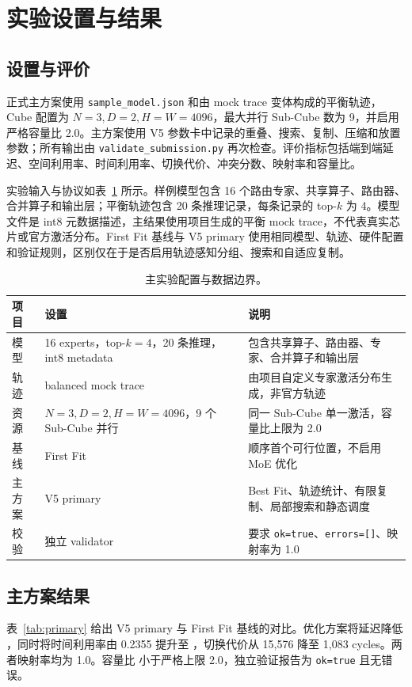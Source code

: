 \section{实验设置与结果}
\subsection{设置与评价}
正式主方案使用 \texttt{sample\_model.json} 和由 mock trace 变体构成的平衡轨迹，Cube 配置为 $N=3,D=2,H=W=4096$，最大并行 Sub-Cube 数为 9，并启用严格容量比 2.0。主方案使用 V5 参数卡中记录的重叠、搜索、复制、压缩和放置参数；所有输出由 \texttt{validate\_submission.py} 再次检查。评价指标包括端到端延迟、空间利用率、时间利用率、切换代价、冲突分数、映射率和容量比。

实验输入与协议如表~\ref{tab:setup} 所示。样例模型包含 16 个路由专家、共享算子、路由器、合并算子和输出层；平衡轨迹包含 20 条推理记录，每条记录的 top-$k$ 为 4。模型文件是 int8 元数据描述，主结果使用项目生成的平衡 mock trace，不代表真实芯片或官方激活分布。First Fit 基线与 V5 primary 使用相同模型、轨迹、硬件配置和验证规则，区别仅在于是否启用轨迹感知分组、搜索和自适应复制。

\begin{table}[t]
\centering
\caption{主实验配置与数据边界。}
\label{tab:setup}
\begin{tabularx}{\textwidth}{l l X}
\toprule
项目 & 设置 & 说明 \\
\midrule
模型 & 16 experts，top-$k=4$，20 条推理，int8 metadata & 包含共享算子、路由器、专家、合并算子和输出层 \\
轨迹 & balanced mock trace & 由项目自定义专家激活分布生成，非官方轨迹 \\
资源 & $N=3,D=2,H=W=4096$，9 个 Sub-Cube 并行 & 同一 Sub-Cube 单一激活，容量比上限为 2.0 \\
基线 & First Fit & 顺序首个可行位置，不启用 MoE 优化 \\
主方案 & V5 primary & Best Fit、轨迹统计、有限复制、局部搜索和静态调度 \\
校验 & 独立 validator & 要求 \texttt{ok=true}、\texttt{errors=[]}、映射率为 1.0 \\
\bottomrule
\end{tabularx}
\end{table}

\subsection{主方案结果}
表~\ref{tab:primary} 给出 V5 primary 与 First Fit 基线的对比。优化方案将延迟降低 \PrimaryImprovement{}，同时将时间利用率由 0.2355 提升至 \PrimaryTemporal{}，切换代价从 15,576 降至 1,083 cycles。两者映射率均为 1.0。容量比 \PrimaryCapacity{} 小于严格上限 2.0，独立验证报告为 \texttt{ok=true} 且无错误。

